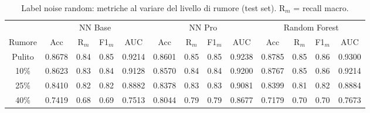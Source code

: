 \begin{table}[H]\centering\footnotesize
\setlength{\tabcolsep}{4pt}
\caption{Label noise random: metriche al variare del livello di rumore (test set). R$_m$ = recall macro.}\label{tab:lnr}
\begin{tabular}{c *{12}{c}}
\toprule
 & \multicolumn{4}{c}{NN Base} & \multicolumn{4}{c}{NN Pro} & \multicolumn{4}{c}{Random Forest}\\
\cmidrule(lr){2-5}\cmidrule(lr){6-9}\cmidrule(lr){10-13}
Rumore & Acc & R$_m$ & F1$_m$ & AUC & Acc & R$_m$ & F1$_m$ & AUC & Acc & R$_m$ & F1$_m$ & AUC \\
\midrule
Pulito & 0.8678 & 0.84 & 0.85 & 0.9214 & 0.8601 & 0.85 & 0.85 & 0.9238 & 0.8785 & 0.85 & 0.86 & 0.9300 \\
10\% & 0.8623 & 0.83 & 0.84 & 0.9128 & 0.8570 & 0.84 & 0.84 & 0.9200 & 0.8767 & 0.85 & 0.86 & 0.9214 \\
25\% & 0.8410 & 0.82 & 0.82 & 0.8882 & 0.8378 & 0.83 & 0.83 & 0.9081 & 0.8399 & 0.81 & 0.82 & 0.8884 \\
40\% & 0.7419 & 0.68 & 0.69 & 0.7513 & 0.8044 & 0.79 & 0.79 & 0.8677 & 0.7179 & 0.70 & 0.70 & 0.7673 \\
\bottomrule
\end{tabular}
\end{table}
